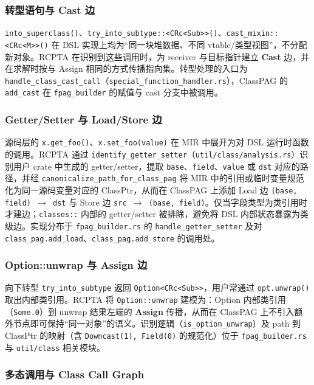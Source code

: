\subsubsection{转型语句与 Cast 边}

\texttt{into\_superclass()}、\texttt{try\_into\_subtype::<CRc<Sub>>()}、\texttt{cast\_mixin::<CRc<M>>()} 在 DSL 实现上均为“同一块堆数据、不同 vtable/类型视图”，不分配新对象。RCPTA 在识别到这些调用时，为 receiver 与目标指针建立 \textbf{Cast} 边，并在求解时按与 Assign 相同的方式传播指向集。转型处理的入口为 \texttt{handle\_class\_cast\_call}（\texttt{special\_function\_handler.rs}），ClassPAG 的 \texttt{add\_cast} 在 \texttt{fpag\_builder} 的赋值与 cast 分支中被调用。

\subsubsection{Getter/Setter 与 Load/Store 边}

源码层的 \texttt{x.get\_foo()}、\texttt{x.set\_foo(value)} 在 MIR 中展开为对 DSL 运行时函数的调用。RCPTA 通过 \texttt{identify\_getter\_setter}（\texttt{util/class/analysis.rs}）识别用户 crate 中生成的 getter/setter，提取 \texttt{base}、\texttt{field}、\texttt{value} 或 \texttt{dst} 对应的路径，并经 \texttt{canonicalize\_path\_for\_class\_pag} 将 MIR 中的引用或临时变量规范化为同一源码变量对应的 ClassPtr，从而在 ClassPAG 上添加 Load 边 \texttt{(base, field) $\to$ dst} 与 Store 边 \texttt{src $\to$ (base, field)}。仅当字段类型为类引用时才建边；\texttt{classes::} 内部的 getter/setter 被排除，避免将 DSL 内部状态暴露为类级边。实现分布于 \texttt{fpag\_builder.rs} 的 \texttt{handle\_getter\_setter} 及对 \texttt{class\_pag.add\_load}、\texttt{class\_pag.add\_store} 的调用处。

\subsubsection{Option::unwrap 与 Assign 边}

向下转型 \texttt{try\_into\_subtype} 返回 \texttt{Option<CRc<Sub>>}，用户常通过 \texttt{opt.unwrap()} 取出内部类引用。RCPTA 将 \texttt{Option::unwrap} 建模为：Option 内部类引用（\texttt{Some.0}）到 unwrap 结果左端的 \textbf{Assign} 传播，从而在 ClassPAG 上不引入额外节点即可保持“同一对象”的语义。识别逻辑（\texttt{is\_option\_unwrap}）及 path 到 ClassPtr 的映射（含 \texttt{Downcast(1), Field(0)} 的规范化）位于 \texttt{fpag\_builder.rs} 与 \texttt{util/class} 相关模块。

\subsubsection{多态调用与 Class Call Graph}

